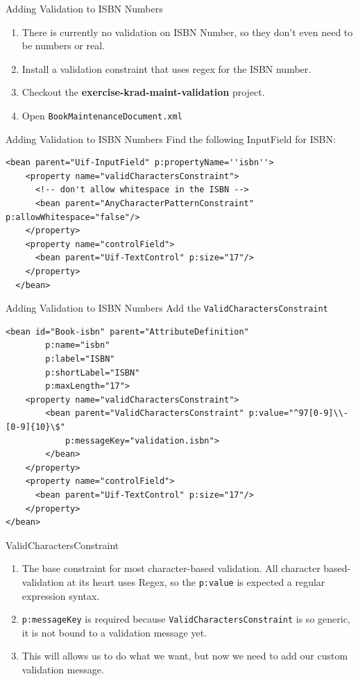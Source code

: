 \documentclass[xcolor=dvipsnames,14pt,professionalfonts]{beamer}
\begin{document}
\begin{frame}{Adding Validation to ISBN Numbers}
  \begin{enumerate}
  \item There is currently no validation on ISBN Number, so they don't
    even need to be numbers or real.
  \item Install a validation constraint that uses regex for the ISBN number.
  \item Checkout the \textbf{exercise-krad-maint-validation}
    project.
  \item Open \texttt{BookMaintenanceDocument.xml}
  \end{enumerate}
\end{frame}

\begin{frame}[fragile]{Adding Validation to ISBN Numbers}
 Find the following InputField for ISBN:
    \begin{verbatim}
<bean parent="Uif-InputField" p:propertyName=''isbn''>
    <property name="validCharactersConstraint">
      <!-- don't allow whitespace in the ISBN -->
      <bean parent="AnyCharacterPatternConstraint" p:allowWhitespace="false"/>
    </property>
    <property name="controlField">
      <bean parent="Uif-TextControl" p:size="17"/>
    </property>
  </bean>
    \end{verbatim}
    
\end{frame}

\begin{frame}[fragile]{Adding Validation to ISBN Numbers}
Add the \texttt{ValidCharactersConstraint}
    \begin{verbatim}
<bean id="Book-isbn" parent="AttributeDefinition"
        p:name="isbn"
        p:label="ISBN"
        p:shortLabel="ISBN"
        p:maxLength="17">
    <property name="validCharactersConstraint">
		<bean parent="ValidCharactersConstraint" p:value="^97[0-9]\\-[0-9]{10}\$" 
			p:messageKey="validation.isbn">
		</bean>
    </property>
    <property name="controlField">
      <bean parent="Uif-TextControl" p:size="17"/>
    </property>
</bean>
    \end{verbatim}
    
\end{frame}

\begin{frame}{ValidCharactersConstraint}
  \begin{enumerate}
    \item The base constraint for most character-based validation. All
      character based-validation at its heart uses Regex, so the
      \texttt{p:value} is expected a regular expression syntax.
    \item \texttt{p:messageKey} is required because
      \texttt{ValidCharactersConstraint} is so generic, it is not
      bound to a validation message yet.
    \item This will allows us to do what we want, but now we need to
      add our custom validation message.
  \end{enumerate}
\end{frame}
\end{document}
